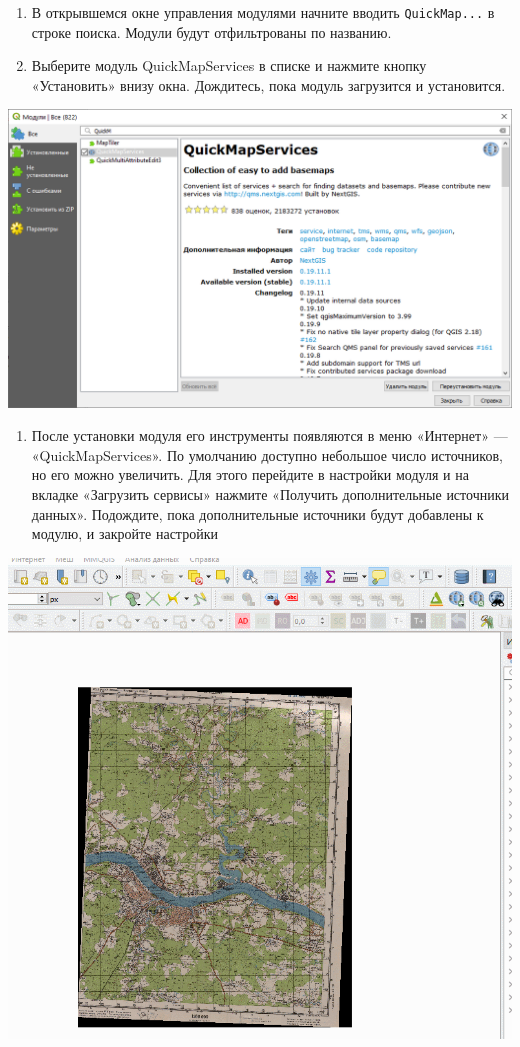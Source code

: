 \documentclass[
  12pt,
]{book}
\providecommand{\tightlist}{%
  \setlength{\itemsep}{0pt}\setlength{\parskip}{0pt}}
\begin{document}
\begin{enumerate}
\def\labelenumi{\arabic{enumi}.}
\setcounter{enumi}{1}
\item
  В открывшемся окне управления модулями начните вводить \texttt{QuickMap...} в строке поиска. Модули будут отфильтрованы по названию.
\item
  Выберите модуль QuickMapServices в списке и нажмите кнопку «Установить» внизу окна. Дождитесь, пока модуль загрузится и установится.
\end{enumerate}

\includegraphics{images/Ex05_Reference/modules02.png}

\begin{enumerate}
\def\labelenumi{\arabic{enumi}.}
\setcounter{enumi}{3}
\tightlist
\item
  После установки модуля его инструменты появляются в меню «Интернет» --- «QuickMapServices». По умолчанию доступно небольшое число источников, но его можно увеличить. Для этого перейдите в настройки модуля и на вкладке «Загрузить сервисы» нажмите «Получить дополнительные источники данных». Подождите, пока дополнительные источники будут добавлены к модулю, и закройте настройки
\end{enumerate}

\includegraphics{images/Ex05_Reference/AddSources.gif}
\end{document}
